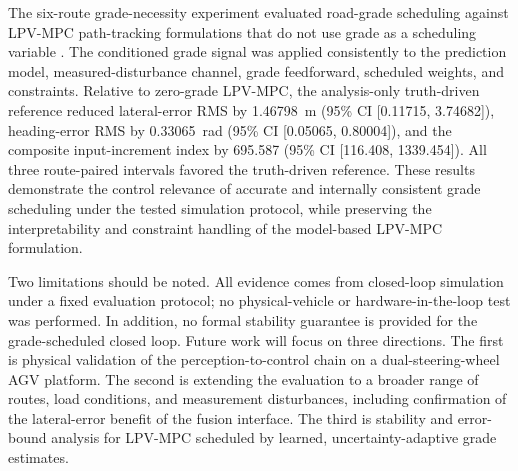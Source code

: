 \documentclass{ieeeaccess}
\newcommand{\citep}[1]{\cite{#1}}
\begin{document}
The six-route grade-necessity experiment evaluated road-grade scheduling
against LPV-MPC path-tracking formulations that do not use grade as a
scheduling variable
\citep{Alcala2020AutonomousRacingLPVMPC,
Tian2022GainScheduledLPVMPC,Cheng2021VelocityVaryingMPC}.
The conditioned grade signal was applied consistently to the prediction
model, measured-disturbance channel, grade feedforward, scheduled
weights, and constraints. Relative to zero-grade LPV-MPC, the
analysis-only truth-driven reference reduced lateral-error RMS by
1.46798~m (95\% CI [0.11715, 3.74682]), heading-error RMS by
0.33065~rad (95\% CI [0.05065, 0.80004]), and the composite
input-increment index by 695.587 (95\% CI [116.408, 1339.454]).
All three route-paired intervals favored the truth-driven reference.
These results demonstrate the control relevance of accurate and
internally consistent grade scheduling under the tested simulation
protocol, while preserving the interpretability and constraint
handling of the model-based LPV-MPC formulation.

Two limitations should be noted. All evidence comes from closed-loop simulation under a fixed evaluation protocol; no physical-vehicle or hardware-in-the-loop test was performed. In addition, no formal stability guarantee is provided for the grade-scheduled closed loop. Future work will focus on three directions. The first is physical validation of the perception-to-control chain on a dual-steering-wheel AGV platform. The second is extending the evaluation to a broader range of routes, load conditions, and measurement disturbances, including confirmation of the lateral-error benefit of the fusion interface. The third is stability and error-bound analysis for LPV-MPC scheduled by learned, uncertainty-adaptive grade estimates.

\FloatBarrier
\balance




\EOD
\end{document}
